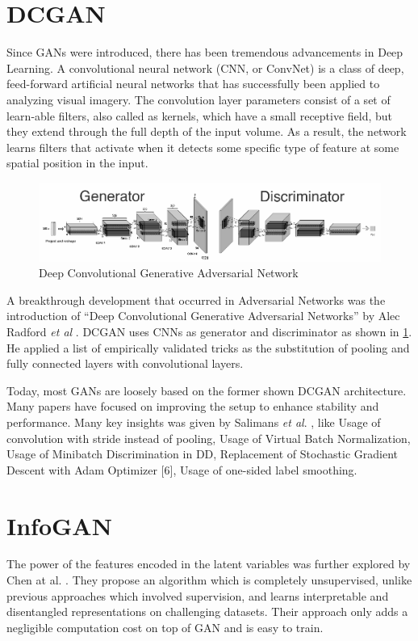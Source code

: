 \section{DCGAN} %
\label{sec:dcgan}
Since GANs were introduced, there has been tremendous advancements in Deep Learning. A convolutional neural network (CNN, or ConvNet) \cite{imagenet} is a class of deep, feed-forward artificial neural networks that has successfully been applied to analyzing visual imagery. The convolution layer parameters consist of a set of learn-able filters, also called as kernels, which have a small receptive field, but they extend through the full depth of the input volume. As a result, the network learns filters that activate when it detects some specific type of feature at some spatial position in the input.
\par\bigskip
\begin{figure}[H]
\centering\includegraphics[width=1\textwidth]{images/dcgan.png}
\caption{Deep Convolutional Generative Adversarial Network}
\label{fig:dcgan}
\end{figure}
A breakthrough development that occurred in Adversarial Networks was the introduction of “Deep Convolutional Generative Adversarial Networks” by Alec Radford \textit{et al} \cite{dcgan}. DCGAN uses CNNs as generator and discriminator as shown in \ref{fig:dcgan}. He applied a list of empirically validated tricks as the substitution of pooling and fully connected layers with convolutional layers.
\par\bigskip
Today, most GANs are loosely based on the former shown DCGAN \cite{dcgan} architecture. Many papers have focused on improving the setup to enhance stability and performance. Many key insights was given by Salimans \textit{et al}. \cite{improvedgan}, like Usage of convolution with stride instead of pooling, Usage of Virtual Batch Normalization, Usage of Minibatch Discrimination in DD, Replacement of Stochastic Gradient Descent with Adam Optimizer [6], Usage of one-sided label smoothing.
\par\bigskip
\section{InfoGAN} %
\label{sec:infogan}
The power of the features encoded in the latent variables was further explored by Chen at al. \cite{infogan}. They propose an algorithm which is completely unsupervised, unlike previous approaches which involved supervision, and learns interpretable and disentangled representations on challenging datasets. Their approach only adds a negligible computation cost on top of GAN and is easy to train.
\par\bigskip


